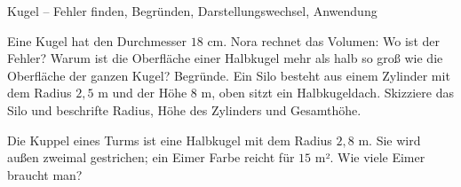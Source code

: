 \begin{aufgabe}{Kugel – Fehler finden, Begründen, Darstellungswechsel, Anwendung}
\begin{teile}
\teil Eine Kugel hat den Durchmesser $18$ cm. Nora rechnet das Volumen:  Wo ist der Fehler?
\teil Warum ist die Oberfläche einer Halbkugel mehr als halb so groß wie die Oberfläche der ganzen Kugel? Begründe.
\teil Ein Silo besteht aus einem Zylinder mit dem Radius $2{,}5$ m und der Höhe $8$ m, oben sitzt ein Halbkugeldach. Skizziere das Silo und beschrifte Radius, Höhe des Zylinders und Gesamthöhe.

\teil Die Kuppel eines Turms ist eine Halbkugel mit dem Radius $2{,}8$ m. Sie wird außen zweimal gestrichen; ein Eimer Farbe reicht für $15$ m². Wie viele Eimer braucht man?
\end{teile}
\end{aufgabe}
